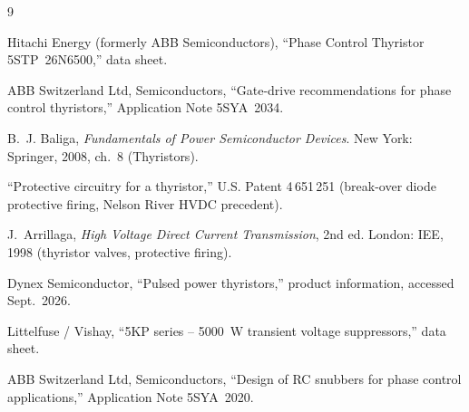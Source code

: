 \documentclass[11pt,a4paper]{article}
\begin{document}
\begin{thebibliography}{9}

Hitachi Energy (formerly ABB Semiconductors), ``Phase Control Thyristor 5STP~26N6500,'' data sheet.

ABB Switzerland Ltd, Semiconductors, ``Gate-drive recommendations for phase control thyristors,''
Application Note 5SYA~2034.

B.~J. Baliga, \emph{Fundamentals of Power Semiconductor Devices}. New York: Springer, 2008,
ch.~8 (Thyristors).

``Protective circuitry for a thyristor,'' U.S. Patent 4\,651\,251 (break-over diode protective firing, Nelson River HVDC precedent).

J.~Arrillaga, \emph{High Voltage Direct Current Transmission}, 2nd ed. London: IEE, 1998
(thyristor valves, protective firing).

Dynex Semiconductor, ``Pulsed power thyristors,'' product information, accessed Sept.~2026.

Littelfuse / Vishay, ``5KP series -- 5000~W transient voltage suppressors,'' data sheet.

ABB Switzerland Ltd, Semiconductors, ``Design of RC snubbers for phase control applications,''
Application Note 5SYA~2020.

\end{thebibliography}
\end{document}
